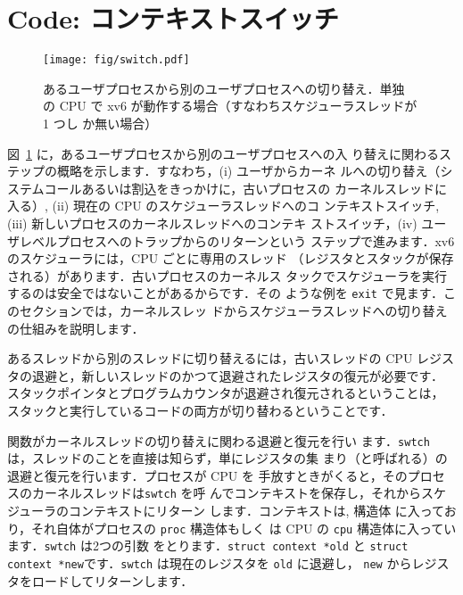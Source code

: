 \section{Code: コンテキストスイッチ}

\begin{figure}[t]
\center
\texttt{[image: fig/switch.pdf]}
\caption{あるユーザプロセスから別のユーザプロセスへの切り替え．単独
  の CPU で xv6 が動作する場合（すなわちスケジューラスレッドが 1 つし
  か無い場合）}
\label{fig:switch}
\end{figure}

図~\ref{fig:switch} に，あるユーザプロセスから別のユーザプロセスへの入
り替えに関わるステップの概略を示します．すなわち，(i) ユーザからカーネ
ルへの切り替え（システムコールあるいは割込をきっかけに，古いプロセスの
カーネルスレッドに入る）, (ii) 現在の CPU のスケジューラスレッドへのコ
ンテキストスイッチ, (iii) 新しいプロセスのカーネルスレッドへのコンテキ
ストスイッチ，(iv) ユーザレベルプロセスへのトラップからのリターンという
ステップで進みます．xv6 のスケジューラには，CPU ごとに専用のスレッド
（レジスタとスタックが保存される）があります．古いプロセスのカーネルス
タックでスケジューラを実行するのは安全ではないことがあるからです．その
ような例を \lstinline{exit} で見ます．このセクションでは，カーネルスレッ
ドからスケジューラスレッドへの切り替えの仕組みを説明します．

あるスレッドから別のスレッドに切り替えるには，古いスレッドの CPU レジス
タの退避と，新しいスレッドのかつて退避されたレジスタの復元が必要です．
スタックポインタとプログラムカウンタが退避され復元されるということは，
スタックと実行しているコードの両方が切り替わるということです．

 関数がカーネルスレッドの切り替えに関わる退避と復元を行い
ます．\lstinline{swtch} は，スレッドのことを直接は知らず，単にレジスタの集
まり（と呼ばれる）の退避と復元を行います．プロセスが CPU を
手放すときがくると，そのプロセスのカーネルスレッドは\lstinline{swtch} を呼
んでコンテキストを保存し，それからスケジューラのコンテキストにリターン
します．コンテキストは,  構造体 
に入っており，それ自体がプロセスの \lstinline{proc} 構造体もしく
は CPU の \lstinline{cpu} 構造体に入っています．\lstinline{swtch} は2つの引数
をとります．\lstinline{struct context *old} と 
\lstinline{struct context *new}です．\lstinline{swtch} 
は現在のレジスタを \lstinline{old} に退避し，
\lstinline{new} からレジスタをロードしてリターンします．

